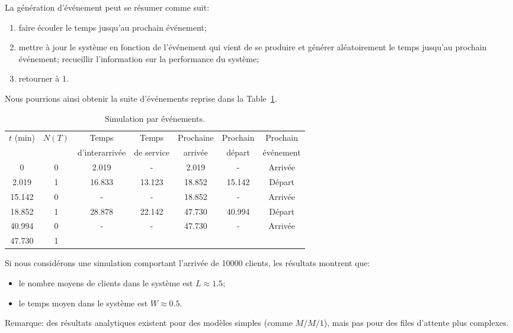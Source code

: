 \begin{example}
La génération d'événement peut se résumer comme suit:
\begin{enumerate}
\item
faire écouler le temps jusqu'au prochain événement;
\item
mettre à jour le système en fonction de l'événement qui vient de se produire et générer aléatoirement le temps jusqu'au prochain événement; recueillir l'information sur la performance du système;
\item
retourner à 1.
\end{enumerate}
Nous pourrions ainsi obtenir la suite d'événements reprise dans la Table~\ref{tab:simulevents}.

\begin{table}[htbp]
\begin{center}
\begin{tabular}{|c|c|c|c|c|c|c|}
\hline
$t$ (min) & $N(T)$ & Temps & Temps &  Prochaine & Prochain & Prochain \\
& & d'interarrivée & de service & arrivée & départ & événement \\
\hline
0 & 0 & 2.019 & - & 2.019 & - & Arrivée \\
\hline
2.019 & 1 & 16.833 & 13.123 & 18.852 & 15.142 & Départ \\
\hline
15.142 & 0 & - & - & 18.852 & - & Arrivée \\
\hline
18.852 & 1 & 28.878 & 22.142 & 47.730 & 40.994 & Départ \\
\hline
40.994 & 0 & - & - & 47.730 & - & Arrivée \\
\hline
47.730 & 1 & & & & & \\
\hline
\end{tabular}
\caption{Simulation par événements.}
\label{tab:simulevents}
\end{center}
\end{table}

Si nous considérons une simulation comportant l'arrivée de 10000 clients, les résultats montrent que:
\begin{itemize}
\item
 le nombre moyens de clients dans le système est $L \approx 1.5$;
\item
 le temps moyen dans le système est $W \approx 0.5$.
\end{itemize}

Remarque: des résultats analytiques existent pour des modèles simples (comme $M/M/1$), mais pas pour des files d'attente plus complexes.
\end{example}


